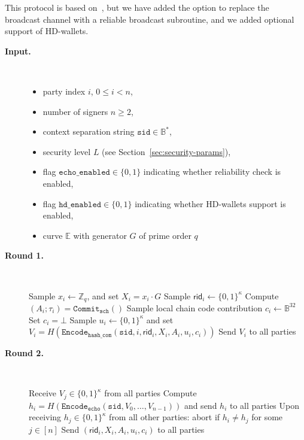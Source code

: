 \documentclass[11pt]{article}
\newcommand{\sid}{\ensuremath{\mathtt{sid}}}
\newcommand{\var}[1]{\ensuremath{\mathtt{#1}}}
\newcommand{\commit}[1]{\ensuremath{\mathtt{Commit}_{\mathtt{#1}}}}
\newcommand{\Encode}[1][]{\ensuremath{\mathtt{Encode}_{\mathtt{#1}}}}
\newcommand{\rid}{\textsf{rid}}
\newcommand{\E}{\mathbb{E}}
\newcommand{\Z}{\mathbb{Z}}
\newcommand{\?}[1]{\stackrel{?}{#1}}
\newcommand{\Bit}{\ensuremath{\{0{,}1\}}}
\newcommand{\Byte}{\ensuremath{\mathbb{B}}}
\begin{document}
This protocol is based on~\cite[Figure~5]{cggmp24}, but we have added the option to replace the broadcast channel with a reliable broadcast subroutine, and we added optional support of HD-wallets.

\begin{description}
    \item[\bf Input.] \
    \begin{itemize}[noitemsep,topsep=0pt]
    \item party index $i$, $0 \le i < n$,
    \item number of signers $n \ge 2$,
    \item context separation string $\sid \in \Byte^*$,
    \item security level $L$ (see Section~\ref{sec:security-params}),
    \item flag $\var{echo\_enabled} \in \Bit$ indicating whether reliability check is enabled,
    \item flag $\var{hd\_enabled} \in \Bit$ indicating whether HD-wallets support is enabled,
    \item curve $\E$ with generator $G$ of prime order $q$
    \end{itemize}

    \item[\bf Round 1.] \
    \begin{algorithmic}[1]
        \State Sample $x_i \gets \Z_q$, 
        and set $X_i = x_i \cdot G$
        \State Sample $\rid_i \gets \Bit^\kappa$
        \State Compute $(A_i; \tau_i) = \commit{sch}()$
        \If{\var{hd\_wallets}}
            \State Sample local chain code contribution $c_i \gets \Byte^{32}$
        \Else
            \State Set $c_i = \bot$
        \EndIf
        \State Sample $u_i \gets \Bit^\kappa$
        and set $V_i = H(\Encode[hash\_com](\sid, i, \rid_i, X_i, A_i, u_i, c_i))$
        \State Send $V_i$ to all parties
    \end{algorithmic}

    \item[\bf Round 2.] \
    \begin{algorithmic}[1]
        \State Receive $V_j \in \Bit^\kappa$ from all parties
        \If{$\var{echo\_enabled}$} 
            \State Compute $h_i = H(\Encode[echo](\sid, V_0, \dots, V_{n-1}))$ and
            send $h_i$ to all parties
            \State Upon receiving $h_j \in \Bit^\kappa$ from all other parties: abort if $h_i \neq h_j$ for some $j\in [n]$
        \EndIf
        \State Send $(\rid_i, X_i, A_i, u_i, c_i)$ to all parties
    \end{algorithmic}
 

\end{description}
\end{document}
